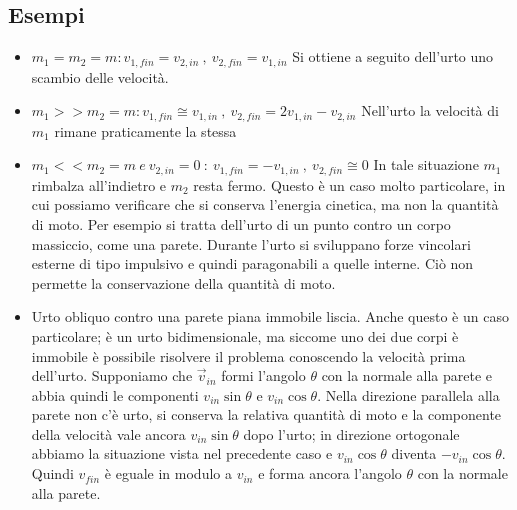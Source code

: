 \documentclass[class=book, crop=false, oneside, 12pt]{standalone}
\begin{document}
\subsection{Esempi}
\begin{itemize}
    \item \(m_1 = m_2 = m : v_{1,fin} = v_{2,in} \ , \ v_{2,fin} = v_{1,in}\) \newline
    Si ottiene a seguito dell'urto uno scambio delle velocità. 
    \item \(m_1 >> m_2 = m : v_{1,fin} \cong v_{1,in} \ , \ v_{2,fin} = 2 v_{1,in} - v_{2,in}\) \newline
    Nell'urto la velocità di \(m_1\) rimane praticamente la stessa
    \item \(m_1 << m_2 = m \ e \ v_{2,in} = 0  \ : \ v_{1,fin} = - v_{1,in} \ , \ v_{2,fin} \cong 0 \) \newline
    In tale situazione \(m_1\) rimbalza all'indietro e \(m_2\) resta fermo. 
    Questo è un caso molto particolare, in cui possiamo verificare che si conserva l'energia cinetica, ma non la quantità di moto.
    Per esempio si tratta dell'urto di un punto contro un corpo massiccio, come una parete.
    Durante l'urto si sviluppano forze vincolari esterne di tipo impulsivo e quindi paragonabili a quelle interne. 
    Ciò non permette la conservazione della quantità di moto.
    \item Urto obliquo contro una parete piana immobile liscia.\newline
    Anche questo è un caso particolare; è un urto bidimensionale, ma siccome uno dei due corpi è immobile è possibile risolvere il problema conoscendo la velocità prima dell'urto.
    Supponiamo che \(\overrightarrow{v}_{in}\) formi l'angolo \(\theta\) con la normale alla parete e abbia quindi le componenti \(v_{in} \sin \theta\) e \(v_{in} \cos \theta\). 
    Nella direzione parallela alla parete non c'è urto, si conserva la relativa quantità di moto e la componente della velocità vale ancora \(v_{in} \sin \theta\) dopo l'urto; 
    in direzione ortogonale abbiamo la situazione vista nel precedente caso e \(v_{in} \cos \theta\) diventa \(-v_{in} \cos \theta\). 
    Quindi \(v_{fin}\) è eguale in modulo a \(v_{in}\) e forma ancora l'angolo \(\theta\) con la normale alla parete. 
\end{itemize}
\end{document}
